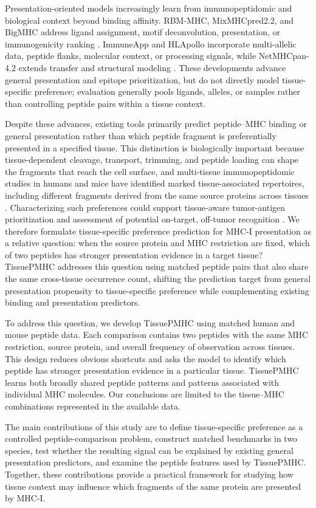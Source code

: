 Presentation-oriented models increasingly learn from immunopeptidomic and biological context beyond binding affinity. RBM-MHC, MixMHCpred2.2, and BigMHC address ligand assignment, motif deconvolution, presentation, or immunogenicity ranking \cite{bravi2021rbmmhc,gfeller2023mixmhcpred,albert2023bigmhc}. ImmuneApp and HLApollo incorporate multi-allelic data, peptide flanks, molecular context, or processing signals, while NetMHCpan-4.2 extends transfer and structural modeling \cite{xu2024immuneapp,thrift2024hlapollo,nilsson2025netmhcpan}. These developments advance general presentation and epitope prioritization, but do not directly model tissue-specific preference; evaluation generally pools ligands, alleles, or samples rather than controlling peptide pairs within a tissue context.

Despite these advances, existing tools primarily predict peptide--MHC binding or general presentation rather than which peptide fragment is preferentially presented in a specified tissue. This distinction is biologically important because tissue-dependent cleavage, transport, trimming, and peptide loading can shape the fragments that reach the cell surface, and multi-tissue immunopeptidomic studies in humans and mice have identified marked tissue-associated repertoires, including different fragments derived from the same source proteins across tissues \cite{marcu2021atlas,schuster2018mouse,kubiniok2022constitutive}. Characterizing such preferences could support tissue-aware tumor-antigen prioritization and assessment of potential on-target, off-tumor recognition \cite{marcu2021atlas,lemke2025pcidb}. We therefore formulate tissue-specific preference prediction for MHC-I presentation as a relative question: when the source protein and MHC restriction are fixed, which of two peptides has stronger presentation evidence in a target tissue? TissuePMHC addresses this question using matched peptide pairs that also share the same cross-tissue occurrence count, shifting the prediction target from general presentation propensity to tissue-specific preference while complementing existing binding and presentation predictors.

To address this question, we develop TissuePMHC using matched human and mouse peptide data. Each comparison contains two peptides with the same MHC restriction, source protein, and overall frequency of observation across tissues. This design reduces obvious shortcuts and asks the model to identify which peptide has stronger presentation evidence in a particular tissue. TissuePMHC learns both broadly shared peptide patterns and patterns associated with individual MHC molecules. Our conclusions are limited to the tissue--MHC combinations represented in the available data.

The main contributions of this study are to define tissue-specific preference as a controlled peptide-comparison problem, construct matched benchmarks in two species, test whether the resulting signal can be explained by existing general presentation predictors, and examine the peptide features used by TissuePMHC. Together, these contributions provide a practical framework for studying how tissue context may influence which fragments of the same protein are presented by MHC-I.
